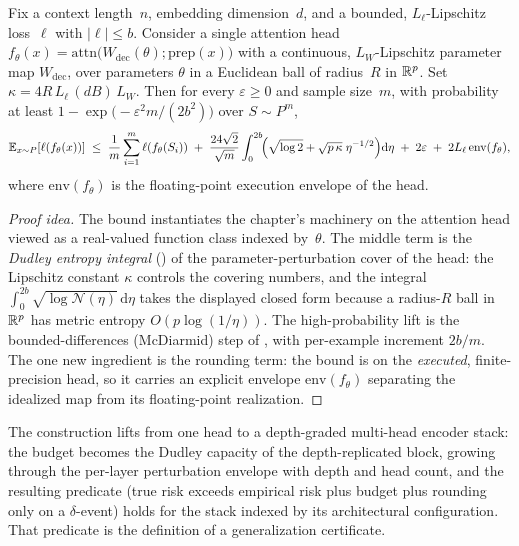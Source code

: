 \begin{prop}
\label{prop:certified-attention}
Fix a context length~$n$, embedding dimension~$d$, and a bounded,
$L_\ell$-Lipschitz loss~$\ell$ with $|\ell| \leq b$.  Consider a single
attention head $f_\theta(x) = \mathrm{attn}\bigl(W_{\mathrm{dec}}(\theta);
\mathrm{prep}(x)\bigr)$ with a continuous, $L_W$-Lipschitz parameter map
$W_{\mathrm{dec}}$, over parameters $\theta$ in a Euclidean ball of
radius~$R$ in $\mathbb{R}^p$.  Set $\kappa = 4R\,L_\ell\,(dB)\,L_W$.  Then for every
$\varepsilon \geq 0$ and sample size~$m$, with probability at least
$1 - \exp\!\bigl(-\varepsilon^2 m / (2b^2)\bigr)$ over $S \sim P^m$,
\[
  \mathbb{E}_{x \sim P}[\ell(f_\theta(x))]
  \;\leq\; \frac{1}{m}\sum_{i=1}^m \ell(f_\theta(S_i))
    \;+\; \frac{24\sqrt{2}}{\sqrt{m}}
      \int_0^{2b}\!\Bigl(\sqrt{\log 2}
        + \sqrt{p\,\kappa}\;\eta^{-1/2}\Bigr)\mathrm{d}\eta
    \;+\; 2\varepsilon
    \;+\; 2 L_\ell\,\mathrm{env}(f_\theta),
\]
where $\mathrm{env}(f_\theta)$ is the floating-point execution envelope of
the head.
\end{prop}

\begin{proof}[Proof idea]
The bound instantiates the chapter's machinery on the attention head viewed
as a real-valued function class indexed by~$\theta$.  The middle term is the
\emph{Dudley entropy integral} () of the
parameter-perturbation cover of the head: the Lipschitz constant $\kappa$
controls the covering numbers, and the integral $\int_0^{2b}\sqrt{\log
\mathcal{N}(\eta)}\,\mathrm{d}\eta$ takes the displayed closed form because a
radius-$R$ ball in $\mathbb{R}^p$ has metric entropy $O(p\log(1/\eta))$.  The
high-probability lift is the bounded-differences (McDiarmid) step of
, with per-example increment $2b/m$.  The one new
ingredient is the rounding term: the bound is on the \emph{executed},
finite-precision head, so it carries an explicit envelope
$\mathrm{env}(f_\theta)$ separating the idealized map from its floating-point
realization.
\end{proof}

The construction lifts from one head to a depth-graded multi-head encoder
stack: the budget becomes the Dudley capacity of the depth-replicated block,
growing through the per-layer perturbation envelope with depth and head
count, and the resulting predicate (true risk exceeds empirical risk plus
budget plus rounding only on a $\delta$-event) holds for the stack
indexed by its architectural
configuration.  That predicate is the
definition of a generalization
certificate.


